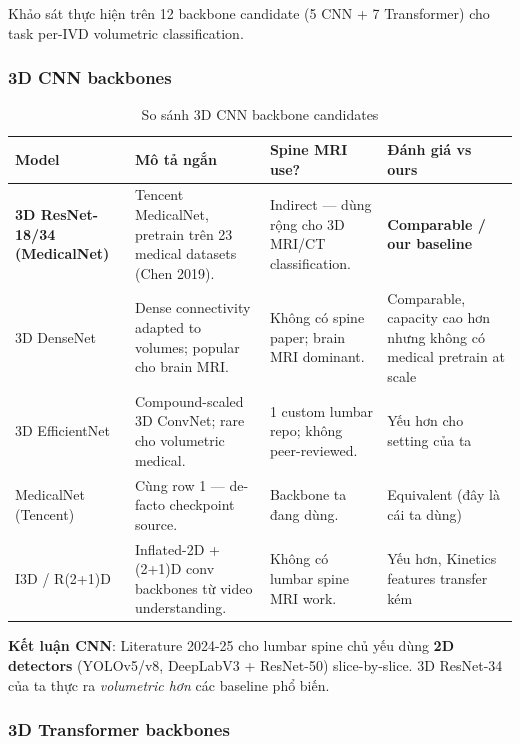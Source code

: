 \documentclass[11pt,a4paper]{article}
\newcommand{\best}[1]{\textcolor{best}{\textbf{#1}}}
\begin{document}
\noindent Khảo sát thực hiện trên 12 backbone candidate (5 CNN + 7
Transformer) cho task per-IVD volumetric classification.

\subsubsection*{3D CNN backbones}

\begin{table}[h]
\centering
\caption{So sánh 3D CNN backbone candidates}
\small
\begin{tabular}{@{}p{2.8cm}p{4.5cm}p{4.5cm}p{2.5cm}@{}}
\toprule
\rowcolor{tablehdr}
Model & Mô tả ngắn & Spine MRI use? & Đánh giá vs ours \\
\midrule
\best{3D ResNet-18/34 (MedicalNet)} & Tencent MedicalNet, pretrain trên 23 medical datasets (Chen 2019). & Indirect --- dùng rộng cho 3D MRI/CT classification. & \best{Comparable / our baseline} \\
3D DenseNet & Dense connectivity adapted to volumes; popular cho brain MRI. & Không có spine paper; brain MRI dominant. & Comparable, capacity cao hơn nhưng không có medical pretrain at scale \\
3D EfficientNet & Compound-scaled 3D ConvNet; rare cho volumetric medical. & 1 custom lumbar repo; không peer-reviewed. & Yếu hơn cho setting của ta \\
MedicalNet (Tencent) & Cùng row 1 --- de-facto checkpoint source. & Backbone ta đang dùng. & Equivalent (đây là cái ta dùng) \\
I3D / R(2+1)D & Inflated-2D + (2+1)D conv backbones từ video understanding. & Không có lumbar spine MRI work. & Yếu hơn, Kinetics features transfer kém \\
\bottomrule
\end{tabular}
\end{table}

\noindent\textbf{Kết luận CNN}: Literature 2024-25 cho lumbar spine
chủ yếu dùng \textbf{2D detectors} (YOLOv5/v8, DeepLabV3 + ResNet-50)
slice-by-slice. 3D ResNet-34 của ta thực ra \emph{volumetric hơn} các
baseline phổ biến.

\subsubsection*{3D Transformer backbones}
\end{document}
